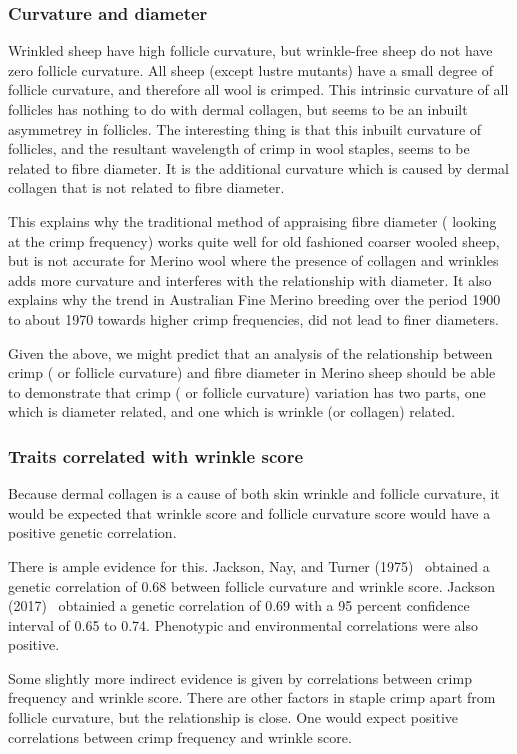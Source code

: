 \documentclass[titlepage]{article}  %
\begin{document}
\subsubsection{Curvature and diameter}
Wrinkled sheep have high follicle curvature, but wrinkle-free sheep do not have zero follicle curvature. All sheep (except lustre mutants) have a small degree of follicle curvature, and therefore all wool is crimped. This intrinsic curvature of all follicles has nothing to do with dermal collagen, but seems to be an inbuilt asymmetrey in follicles. The interesting thing is that this inbuilt curvature of follicles, and the resultant wavelength of crimp in wool staples, seems to be related to fibre diameter.  It is the additional curvature which is caused by dermal collagen that is not related to fibre diameter. 

This explains why the traditional method of appraising fibre diameter ( looking at the crimp frequency) works quite well for old fashioned coarser wooled sheep, but is not accurate for Merino wool where the presence of collagen and wrinkles adds more curvature and interferes with the relationship with diameter. It also explains why the trend in Australian Fine Merino breeding over the period 1900 to about 1970 towards higher crimp frequencies, did not lead to finer diameters. 

Given the above, we might predict that an analysis of the relationship between crimp ( or follicle curvature) and fibre diameter in Merino sheep should be able to demonstrate that crimp ( or follicle curvature) variation has two parts, one which is diameter related, and one which is wrinkle (or collagen) related.


\subsubsection{Traits correlated with wrinkle score}
Because dermal collagen is a cause of both skin wrinkle and follicle curvature, it would be expected that wrinkle score and follicle curvature score would have a positive genetic correlation. 

There is ample evidence for this. Jackson, Nay, and Turner (1975)~\cite{jack:75} obtained a genetic correlation of 0.68 between follicle curvature and wrinkle score.  Jackson (2017)~\cite{jack:17a} obtainied a genetic correlation of 0.69 with a 95 percent confidence interval of 0.65 to 0.74. Phenotypic and environmental correlations were also positive.

Some slightly more indirect evidence is given by correlations between crimp frequency and wrinkle score. There are other factors in staple crimp apart from follicle curvature, but the relationship is close. One would expect positive correlations between crimp frequency and wrinkle score. 
\end{document}
